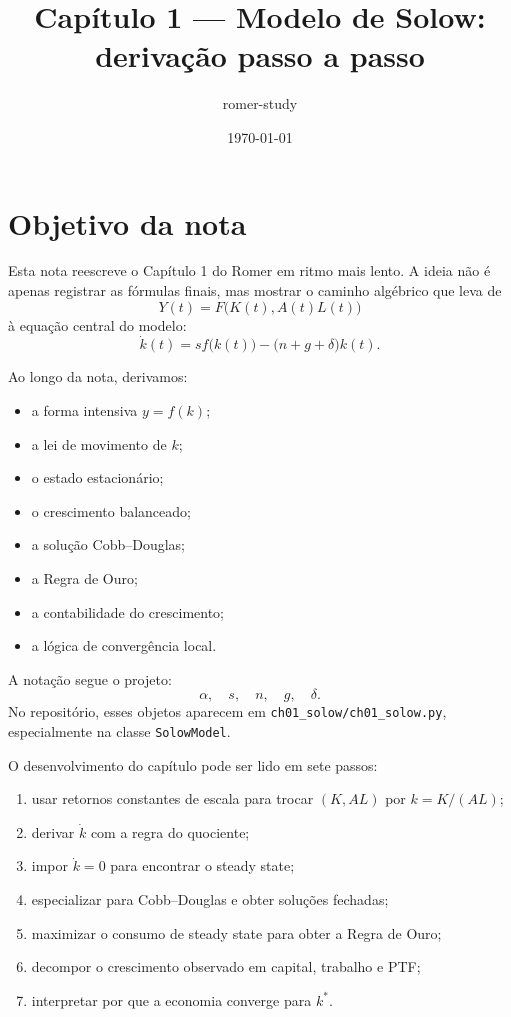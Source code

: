 \documentclass[11pt,a4paper]{article}
\title{Cap\'itulo 1 --- Modelo de Solow: deriva\c{c}\~ao passo a passo}
\author{romer-study}
\date{\today}
\begin{document}
\maketitle
{
\small
\setlength{\parskip}{0pt}
\tableofcontents
}
\vspace{0.25em}

\section{Objetivo da nota}

Esta nota reescreve o Cap\'itulo 1 do Romer em ritmo mais lento. A ideia n\~ao
\'e apenas registrar as f\'ormulas finais, mas mostrar o caminho alg\'ebrico que
leva de
\[
Y(t)=F\bigl(K(t),A(t)L(t)\bigr)
\]
\`a equa\c{c}\~ao central do modelo:
\[
\dot{k}(t)=s f\bigl(k(t)\bigr)-\bigl(n+g+\delta\bigr)k(t).
\]

Ao longo da nota, derivamos:
\begin{itemize}
  \item a forma intensiva \(y=f(k)\);
  \item a lei de movimento de \(k\);
  \item o estado estacion\'ario;
  \item o crescimento balanceado;
  \item a solu\c{c}\~ao Cobb--Douglas;
  \item a Regra de Ouro;
  \item a contabilidade do crescimento;
  \item a l\'ogica de converg\^encia local.
\end{itemize}

\begin{convencao}
A nota\c{c}\~ao segue o projeto:
\[
\alpha,\quad s,\quad n,\quad g,\quad \delta.
\]
No reposit\'orio, esses objetos aparecem em
\texttt{ch01\_solow/ch01\_solow.py}, especialmente na classe
\texttt{SolowModel}.
\end{convencao}

\begin{roteiro}
O desenvolvimento do cap\'itulo pode ser lido em sete passos:
\begin{enumerate}
  \item usar retornos constantes de escala para trocar \((K,AL)\) por \(k=K/(AL)\);
  \item derivar \(\dot{k}\) com a regra do quociente;
  \item impor \(\dot{k}=0\) para encontrar o steady state;
  \item especializar para Cobb--Douglas e obter solu\c{c}\~oes fechadas;
  \item maximizar o consumo de steady state para obter a Regra de Ouro;
  \item decompor o crescimento observado em capital, trabalho e PTF;
  \item interpretar por que a economia converge para \(k^\ast\).
\end{enumerate}
\end{roteiro}
\end{document}
